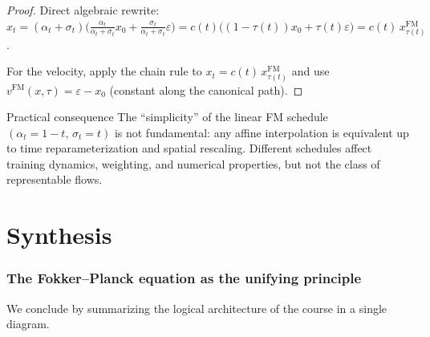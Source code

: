 \documentclass[11pt]{article}
\theoremstyle{definition}
\theoremstyle{remark}
\begin{document}
\begin{proof}
Direct algebraic rewrite:
$x_t = (\alpha_t + \sigma_t)\big(\frac{\alpha_t}{\alpha_t+\sigma_t}x_0 + \frac{\sigma_t}{\alpha_t+\sigma_t}\varepsilon\big) = c(t)\big((1-\tau(t))x_0 + \tau(t)\varepsilon\big) = c(t)\,x_{\tau(t)}^{\mathrm{FM}}$.

For the velocity, apply the chain rule to $x_t = c(t)\,x_{\tau(t)}^{\mathrm{FM}}$ and use $v^{\mathrm{FM}}(x,\tau) = \varepsilon - x_0$ (constant along the canonical path).
\end{proof}

\begin{resultbox}{Practical consequence}
The ``simplicity'' of the linear FM schedule $(\alpha_t = 1-t,\,\sigma_t = t)$ is not fundamental: any affine interpolation is equivalent up to time reparameterization and spatial rescaling.
Different schedules affect training dynamics, weighting, and numerical properties, but not the class of representable flows.
\end{resultbox}

\newpage

\part{Synthesis}

\section{The Fokker--Planck equation as the unifying principle}\label{sec:synthesis}

We conclude by summarizing the logical architecture of the course in a single diagram.
\end{document}

